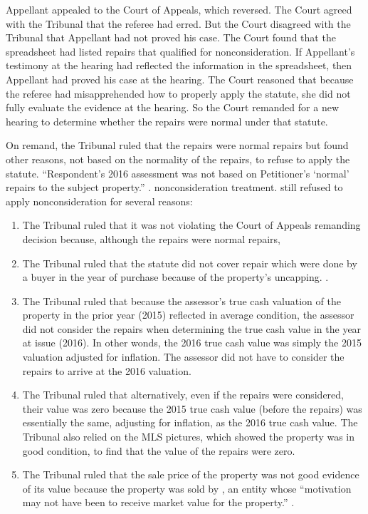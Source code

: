 \documentclass[12pt,\documentclassflag]{michiganCourtOfAppealsBrief}
\begin{document}
Appellant appealed to the Court of Appeals, which reversed. The Court agreed with the Tribunal that the referee had erred.
But the Court disagreed with the Tribunal that Appellant had not proved his case. 
The Court found that the spreadsheet had listed repairs that qualified for nonconsideration.
If Appellant's testimony at the hearing had reflected the information in the spreadsheet, then Appellant had proved his case at the hearing.
The Court reasoned that because the referee had misapprehended how to properly apply the statute, she did not fully evaluate the evidence at the hearing.
So the Court remanded for a new hearing to determine whether the repairs were normal under that statute.

On remand, the Tribunal ruled that the repairs were normal repairs but found other reasons, not based on the normality of the repairs, to refuse to apply the statute.
  ``Respondent's 2016 assessment was not based on Petitioner's `normal' repairs to the subject property.'' .
nonconsideration treatment. still refused to apply nonconsideration for several reasons:

\begin{enumerate}
\item The Tribunal ruled that it was not violating the Court of Appeals remanding decision because, although the repairs were normal repairs,

\item The Tribunal ruled that the statute did not cover repair which were done by a buyer in the year of purchase because of the property's uncapping. .
\item The Tribunal ruled that because the assessor's true cash valuation of the property in the prior year (2015) reflected in average condition, the assessor did not consider the repairs when determining the true cash value in the year at issue (2016). In other wonds, the 2016 true cash value was simply the 2015 valuation adjusted for inflation. The assessor did not have to consider the repairs to arrive at the 2016 valuation. 
\item The Tribunal ruled that alternatively, even if the repairs were considered, their value was zero because the 2015 true cash value (before the repairs) was essentially the same, adjusting for inflation, as the 2016 true cash value. The Tribunal also relied on the MLS pictures, which showed the property was in good condition, to find that the value of the repairs were zero.
\item The Tribunal ruled that the sale price of the property was not good evidence of its value because the property was sold by \HUD, an entity whose ``motivation may not have been to receive market value for the property.'' .
\end{enumerate}
\end{document}
